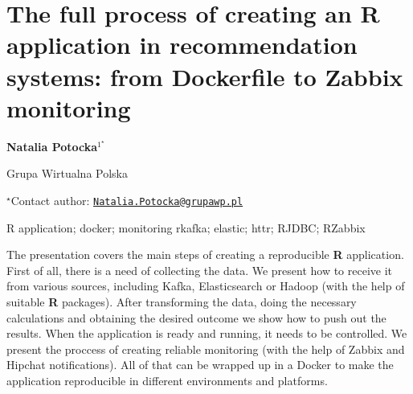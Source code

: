\documentclass[\main/boa.tex]{subfiles}
\begin{document}
\section{The full process of creating an R application in recommendation systems:
from Dockerfile to Zabbix monitoring}

\begin{center}
  {\bf {} Natalia Potocka$^{1^\star}$}
\end{center}

\vskip 0.3cm

\begin{affiliations}
\begin{enumerate}
\begin{minipage}{0.915\textwidth}
\centering
\item Grupa Wirtualna Polska \\[-2pt]
\end{minipage}
\end{enumerate}
$^\star$Contact author: \href{mailto:Natalia.Potocka@grupawp.pl}{\nolinkurl{Natalia.Potocka@grupawp.pl}}\\
\end{affiliations}

\vskip 0.5cm

\begin{minipage}{0.915\textwidth}
\keywords R application; docker; monitoring
\packages {} rkafka;  elastic;  httr;  RJDBC;  RZabbix
\end{minipage}

\vskip 0.8cm

The presentation covers the main steps of creating a reproducible
\textbf{R} application. First of all, there is a need of collecting the
data. We present how to receive it from various sources, including
Kafka, Elasticsearch or Hadoop (with the help of suitable \textbf{R}
packages). After transforming the data, doing the necessary calculations
and obtaining the desired outcome we show how to push out the results.
When the application is ready and running, it needs to be controlled. We
present the proccess of creating reliable monitoring (with the help of
Zabbix and Hipchat notifications). All of that can be wrapped up in a
Docker to make the application reproducible in different environments
and platforms.
\end{document}
